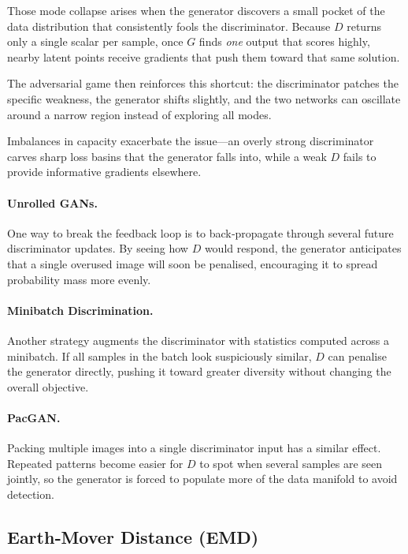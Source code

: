 \documentclass{article}
\begin{document}
Those mode collapse arises when the generator discovers a small pocket of the data distribution that consistently fools the discriminator. Because \(D\) returns only a single scalar per sample, once \(G\) finds \emph{one} output that scores highly, nearby latent points receive gradients that push them toward that same solution.  

The adversarial game then reinforces this shortcut: the discriminator patches the specific weakness, the generator shifts slightly, and the two networks can oscillate around a narrow region instead of exploring all modes.  

Imbalances in capacity exacerbate the issue—an overly strong discriminator carves sharp loss basins that the generator falls into, while a weak \(D\) fails to provide informative gradients elsewhere.

\paragraph{Unrolled GANs.}
One way to break the feedback loop is to back‑propagate through several future discriminator updates.  
By seeing how \(D\) would respond, the generator anticipates that a single overused image will soon be penalised, encouraging it to spread probability mass more evenly.

\paragraph{Minibatch Discrimination.}
Another strategy augments the discriminator with statistics computed across a minibatch.  
If all samples in the batch look suspiciously similar, \(D\) can penalise the generator directly, pushing it toward greater diversity without changing the overall objective.

\paragraph{PacGAN.}
Packing multiple images into a single discriminator input has a similar effect.  
Repeated patterns become easier for \(D\) to spot when several samples are seen jointly, so the generator is forced to populate more of the data manifold to avoid detection.


\subsection*{Earth‑Mover Distance (EMD)}
\end{document}

